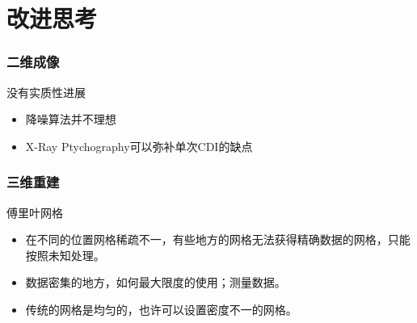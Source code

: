 \documentclass[12pt,aspectratio=169]{beamer} %
\begin{document}
\begin{frame}
    \begin{figure}
    \end{figure}
\end{frame}

\section{改进思考}

\begin{frame}
    \frametitle{二维成像}
    \begin{block}{没有实质性进展}
        \begin{itemize}
            \item 降噪算法并不理想
            \item X-Ray Ptychography可以弥补单次CDI的缺点
        \end{itemize}
    \end{block}
\end{frame}

\begin{frame}
    \frametitle{三维重建}
    \begin{block}{傅里叶网格}
        \begin{itemize}
            \item 在不同的位置网格稀疏不一，有些地方的网格无法获得精确数据的网格，只能按照未知处理。
            \item 数据密集的地方，如何最大限度的使用；测量数据。
            \item 传统的网格是均匀的，也许可以设置密度不一的网格。
        \end{itemize}
    \end{block}
\end{frame}
\end{document}
